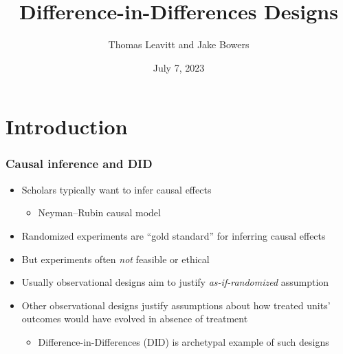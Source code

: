 \documentclass[table, xcolor = {dvipsnames}, 9pt]{beamer}
\title[]{Difference-in-Differences Designs} %
\author{Thomas Leavitt and Jake Bowers} %
\institute[] %
{
\medskip
}
\date{July 7, 2023} %
\theoremstyle{plain}
\begin{document}
\begin{frame}
\titlepage %
\end{frame}


\section{Introduction}
\begin{frame}[t]
\frametitle{Causal inference and DID}
\vfill
\begin{itemize}
\item Scholars typically want to infer causal effects \vfill
\begin{itemize}
\item Neyman--Rubin causal model \citep{neyman1923,rubin1974}  \vfill
\end{itemize} 
\item Randomized experiments are ``gold standard'' for inferring causal effects \vfill
\item But experiments often \textit{not} feasible or ethical \vfill
\item Usually observational designs aim to justify \textit{as-if-randomized} assumption \vfill
\item Other observational designs justify assumptions about how treated units' outcomes would have evolved in absence of treatment \vfill
\begin{itemize}
\item Difference-in-Differences (DID) is archetypal example of such designs \vfill
\end{itemize} 
\end{itemize}
\vfill
\end{frame}
\end{document}

